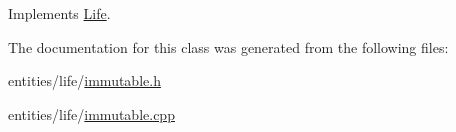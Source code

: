 Implements \hyperlink{class_life_a40b24b079b08e3a80a582eff6be8faa3}{Life}.



The documentation for this class was generated from the following files\-:\begin{DoxyCompactItemize}
\item 
entities/life/\hyperlink{immutable_8h}{immutable.\-h}\item 
entities/life/\hyperlink{immutable_8cpp}{immutable.\-cpp}\end{DoxyCompactItemize}
